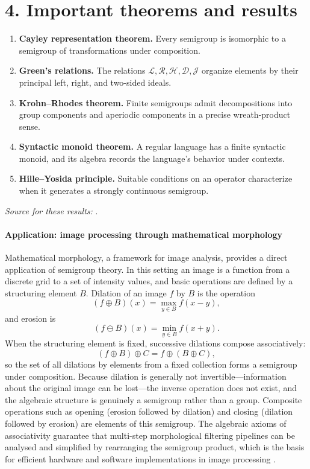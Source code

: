 \section*{4. Important theorems and results}
\begin{enumerate}[leftmargin=*,itemsep=0.35em]
\item \textbf{Cayley representation theorem.} Every semigroup is isomorphic to a semigroup of transformations under composition.

\item \textbf{Green's relations.} The relations $\mathcal L,\mathcal R,\mathcal H,\mathcal D,\mathcal J$ organize elements by their principal left, right, and two-sided ideals.

\item \textbf{Krohn--Rhodes theorem.} Finite semigroups admit decompositions into group components and aperiodic components in a precise wreath-product sense.

\item \textbf{Syntactic monoid theorem.} A regular language has a finite syntactic monoid, and its algebra records the language's behavior under contexts.

\item \textbf{Hille--Yosida principle.} Suitable conditions on an operator characterize when it generates a strongly continuous semigroup.
\end{enumerate}
\noindent\emph{Source for these results:} \cite{semigroup_ref1}.

\paragraph{Application: image processing through mathematical morphology}
Mathematical morphology, a framework for image analysis, provides a direct application of semigroup theory. In this setting an image is a function from a discrete grid to a set of intensity values, and basic operations are defined by a structuring element $B$. Dilation of an image $f$ by $B$ is the operation
\[
(f\oplus B)(x)=\max_{y\in B}f(x-y),
\]
and erosion is
\[
(f\ominus B)(x)=\min_{y\in B}f(x+y).
\]
When the structuring element is fixed, successive dilations compose associatively:
\[
(f\oplus B)\oplus C=f\oplus(B\oplus C),
\]
so the set of all dilations by elements from a fixed collection forms a semigroup under composition. Because dilation is generally not invertible---information about the original image can be lost---the inverse operation does not exist, and the algebraic structure is genuinely a semigroup rather than a group. Composite operations such as opening (erosion followed by dilation) and closing (dilation followed by erosion) are elements of this semigroup. The algebraic axioms of associativity guarantee that multi-step morphological filtering pipelines can be analysed and simplified by rearranging the semigroup product, which is the basis for efficient hardware and software implementations in image processing \cite{semigroup_ref1,semigroup_ref2}.

